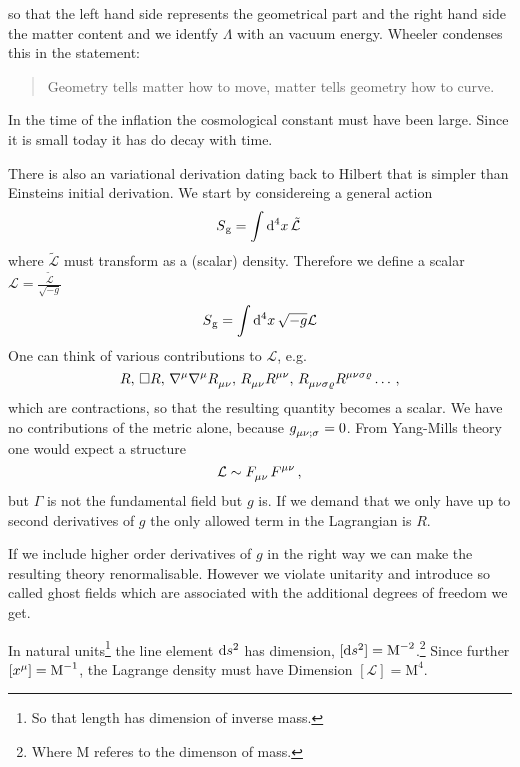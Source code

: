 so that the left hand side represents the geometrical part and the right hand
side the matter content and we identfy $\Lambda$ with an vacuum energy.
Wheeler condenses this in the statement:
\begin{quote}
Geometry tells matter how to move, matter tells geometry how to
curve.
\end{quote}
\begin{sidenote}
In the time of the inflation the cosmological constant must have been large.
Since it is small today it has do decay with time.
\end{sidenote}
There is also an variational derivation dating back to Hilbert that is
simpler than Einsteins initial derivation. We start by considereing a general action
\begin{equation}
S\textsubscript{g}=\fourint  \tilde{\mathcal{L}}\, 
\end{equation}
where $\tilde{\mathcal{L}}$ must transform as a (scalar) density. Therefore we
define a scalar $\mathcal{L}=\frac{\tilde{\mathcal{L}}}{\sqrt{-g}}$
\begin{equation}
S\textsubscript{g}=\fourint \sqrt{-g}\mathcal{L}
\end{equation}
One can think of various contributions to $\mathcal{L}$, e.g.
\begin{equation*}
R,\, \square
R,\,\tensor{\nabla}{^\mu}\tensor{\nabla}{^\mu}\tensor{R}{_\mu_\nu},\,
\tensor{R}{_\mu_\nu}\tensor{R}{^\mu^\nu}
,\,\tensor{R}{_\mu_\nu_\sigma_\varrho}\tensor{R}{^\mu^\nu^\sigma^\varrho}\dots\,,
\end{equation*}
which are contractions, so that the resulting quantity becomes a scalar.
We have no contributions of the metric alone, because
$\tensor{g}{_\mu_\nu_{;\sigma}}=0$. From Yang-Mills theory one would expect a
structure
\begin{equation}
\mathcal{L}\sim\tensor{F}{_\mu_\nu}\tensor{F}{^\mu^\nu}\,,
\end{equation}
but $\Gamma$ is not the fundamental field but $g$ is. If we demand that we only
have up to second derivatives of $g$ the only allowed term in the Lagrangian is
$R$.
\begin{sidenote}
If we include higher order derivatives of $g$ in the right way we can make the
resulting theory renormalisable. However we violate unitarity and introduce so
called ghost fields which are associated with the additional degrees of freedom
we get.
\end{sidenote}
\begin{remark}[Dimensions]
\pushftn
In natural units\footnote{So that length has dimension of inverse mass.} the
line element $\dif s^2$ has dimension, ${[\dif
s^2]=\textrm{M}^{-2}}$.\footnote{Where M referes to the dimenson of mass.} 
Since further ${\left[\tensor{x}{^\mu}\right]=\textrm{M}^{-1}}$,
the Lagrange density must have Dimension
${\left[\mathcal{L}\right]=\textrm{M}^{4}}$.
\end{remark}\popftn
